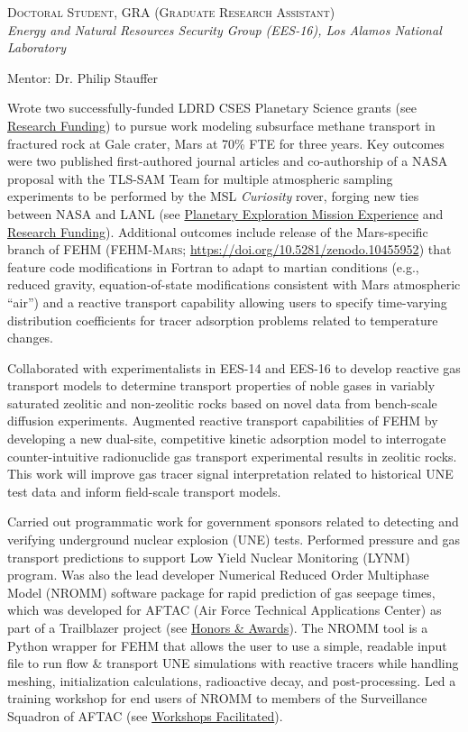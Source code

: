 \documentclass[11pt, letterpaper]{article}
\newcommand{\years}[1]{\marginnote{\scriptsize #1}}
\begin{document}
\noindent
\years{2020 - 2024}\textsc{Doctoral Student, GRA (Graduate Research Assistant)}\\
\textit{Energy and Natural Resources Security Group (EES-16), Los Alamos National Laboratory}

    \vspace{3pt} \noindent  
    Mentor: Dr. Philip Stauffer 

    Wrote two successfully-funded LDRD CSES Planetary Science grants (see
    \hyperref[sec:funding]{Research Funding}) to pursue work modeling
    subsurface methane transport in fractured rock at Gale crater, Mars at 70\%
    FTE for three years. Key outcomes were two published first-authored journal
    articles and co-authorship of a NASA proposal with the TLS-SAM Team for
    multiple atmospheric sampling experiments to be performed by the MSL
    \textit{Curiosity} rover, forging new ties between NASA and LANL (see
    \hyperref[sec:missions]{Planetary Exploration Mission Experience} and
    \hyperref[sec:funding]{Research Funding}). Additional outcomes include release
    of the Mars-specific branch of FEHM (\textsc{FEHM-Mars};
    \href{https://doi.org/10.5281/zenodo.10455952}{https://doi.org/10.5281/zenodo.10455952})
    that feature code modifications in Fortran to adapt to martian conditions (e.g., reduced
        gravity, equation-of-state modifications consistent with Mars atmospheric
    ``air'') and a reactive transport capability allowing users to specify
    time-varying distribution coefficients for tracer adsorption problems related
    to temperature changes.

    Collaborated with experimentalists in EES-14 and EES-16 to develop reactive
    gas transport models to determine transport properties of noble gases in
    variably saturated zeolitic and non-zeolitic rocks based on novel data from
    bench-scale diffusion experiments. Augmented reactive transport
    capabilities of FEHM by developing a new dual-site, competitive kinetic
    adsorption model to interrogate counter-intuitive radionuclide gas
    transport experimental results in zeolitic rocks. This work will improve
    gas tracer signal interpretation related to historical UNE test data and
    inform field-scale transport models.

    Carried out programmatic work for government sponsors related to detecting
    and verifying underground nuclear explosion (UNE) tests. Performed pressure
    and gas transport predictions to support Low Yield Nuclear Monitoring
    (LYNM) program.  Was also the lead developer Numerical Reduced Order
    Multiphase Model (NROMM) software package for rapid prediction of gas
    seepage times, which was developed for AFTAC (Air Force Technical
    Applications Center) as part of a Trailblazer project (see
    \hyperref[sec:awards]{Honors \& Awards}). The NROMM tool is a Python
    wrapper for FEHM that allows the user to use a simple, readable input file
    to run flow \& transport UNE simulations with reactive tracers while
    handling meshing, initialization calculations, radioactive decay, and
    post-processing. Led a training workshop for end users of NROMM to members of
    the  Surveillance Squadron of AFTAC  (see
    \hyperref[sec:workshopsFacilitated]{Workshops Facilitated}). 
\end{document}
